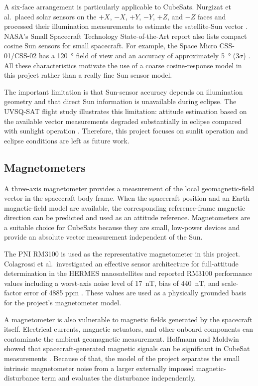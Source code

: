 \documentclass[11pt,a4paper]{article}
\begin{document}
A six-face arrangement is particularly applicable to CubeSats. Nurgizat et al.\ placed solar sensors on the $+X$, $-X$, $+Y$, $-Y$, $+Z$, and $-Z$ faces and processed their illumination measurements to estimate the satellite-Sun vector \cite{nurgizat2023lowcost}. NASA's Small Spacecraft Technology State-of-the-Art report also lists compact cosine Sun sensors for small spacecraft. For example, the Space Micro CSS-01/CSS-02 has a \SI{120}{\degree} field of view and an accuracy of approximately \SI{5}{\degree} (3$\sigma$) \cite{nasa2024soa}. All these characteristics motivate the use of a coarse cosine-response model in this project rather than a really fine Sun sensor model.

The important limitation is that Sun-sensor accuracy depends on illumination geometry and that direct Sun information is unavailable during eclipse. The UVSQ-SAT flight study illustrates this limitation: attitude estimation based on the available vector measurements degraded substantially in eclipse compared with sunlight operation \cite{finance2021uvsqsat}. Therefore, this project focuses on sunlit operation and eclipse conditions are left as future work.

\subsection{Magnetometers}

A three-axis magnetometer provides a measurement of the local geomagnetic-field vector in the spacecraft body frame. When the spacecraft position and an Earth magnetic-field model are available, the corresponding reference-frame magnetic direction can be predicted and used as an attitude reference. Magnetometers are a suitable choice for CubeSats because they are small, low-power devices and provide an absolute vector measurement independent of the Sun.

The PNI RM3100 is used as the representative magnetometer in this project. Colagrossi et al.\ investigated an effective sensor architecture for full-attitude determination in the HERMES nanosatellites and reported RM3100 performance values including a worst-axis noise level of \SI{17}{\nano\tesla}, bias of \SI{440}{\nano\tesla}, and scale-factor error of 4885 ppm \cite{colagrossi2023hermes}. These values are used as a physically grounded basis for the project's magnetometer model.

A magnetometer is also vulnerable to magnetic fields generated by the spacecraft itself. Electrical currents, magnetic actuators, and other onboard components can contaminate the ambient geomagnetic measurement. Hoffmann and Moldwin showed that spacecraft-generated magnetic signals can be significant in CubeSat measurements \cite{hoffmann2022spacecraftnoise}. Because of that, the model of the project separates the small intrinsic magnetometer noise from a larger externally imposed magnetic-disturbance term and evaluates the disturbance independently.
\end{document}
